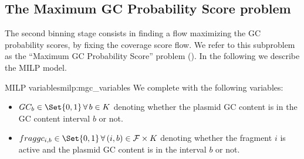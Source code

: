 \subsection{The Maximum GC Probability Score problem \MGC{}}\label{sec:method:mgc}

The second binning stage consists in finding a flow maximizing the GC probability scores, by fixing the coverage score flow.
We refer to this subproblem as the \enquote{Maximum GC Probability Score} problem (\MGC{}).
In the following we describe the MILP model.

\begin{definition}{\MGC{} MILP variables}{milp:mgc_variables}
  We complete  with the following variables:
  \begin{itemize}
    \item \(GC_b \in \Set{0, 1} \, \forall b \in K\) denoting whether the plasmid GC content is in the GC content interval \(b\) or not.
    \item \(\fraggc{i}{b} \in \Set{0, 1} \, \forall (i, b) \in \Fragments{} \times K\) denoting whether the fragment \(i\) is active and the plasmid GC content is in the interval \(b\) or not.
  \end{itemize}
\end{definition}


